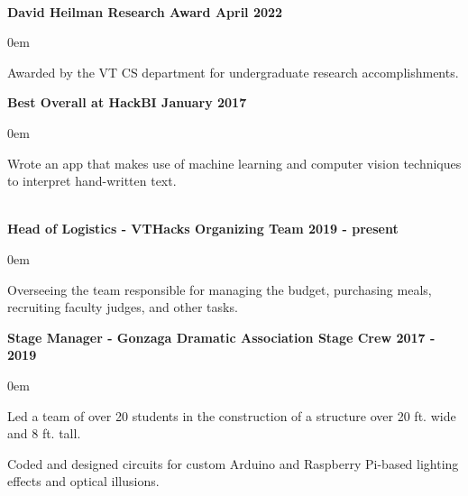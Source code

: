 \documentclass{article}
\begin{document}
\begin{center}
\begin{flushleft}
    {\large\textbf{\underline{}}} \\
    \textbf{David Heilman Research Award \hfill April 2022}
    \begin{compactitem}
      \itemsep0em
      \item Awarded by the VT CS department for undergraduate research accomplishments.
    \end{compactitem}

    \textbf{Best Overall at HackBI \hfill January 2017}
    \begin{compactitem}
      \itemsep0em
      \item Wrote an app that makes use of machine learning and computer vision techniques to interpret hand-written text.
    \end{compactitem}


    {\large\textbf{\underline{}}} \\

    \textbf{Head of Logistics - VTHacks Organizing Team \hfill 2019 - present}
    \begin{compactitem}
      \itemsep0em
      \item Overseeing the team responsible for managing the budget, purchasing meals, recruiting faculty judges, and other tasks.
    \end{compactitem}

    \textbf{Stage Manager - Gonzaga Dramatic Association Stage Crew \hfill 2017 - 2019}
    \begin{compactitem}
      \itemsep0em
      \item Led a team of over 20 students in the construction of a structure over 20 ft. wide and 8 ft. tall.
      \item Coded and designed circuits for custom Arduino and Raspberry Pi-based lighting effects and optical illusions.
    \end{compactitem}


\end{flushleft}
\end{center}
\end{document}

